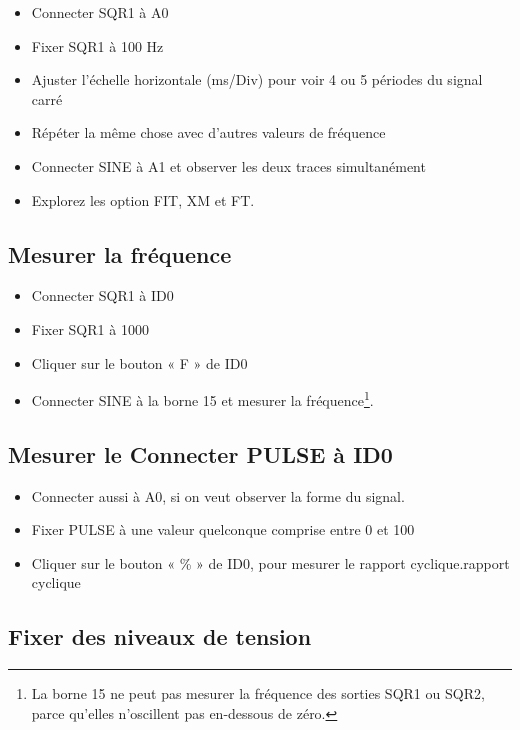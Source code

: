 \documentclass{book}
\begin{document}
\begin{itemize}
  \item Connecter SQR1 à A0
  \item Fixer SQR1 à 100 Hz
  \item Ajuster l'échelle horizontale (ms/Div) pour voir 4 ou 5 périodes du signal carré
  \item Répéter la même chose avec d'autres valeurs de fréquence
  \item Connecter SINE à A1 et observer les deux traces simultanément
  \item Explorez les option FIT, XM et FT.
\end{itemize}




\subsection{Mesurer la fréquence}





\begin{itemize}
  \item Connecter SQR1 à ID0
  \item Fixer SQR1 à 1000
  \item Cliquer sur le bouton « F » de ID0
  \item Connecter SINE à la borne 15 et mesurer la fréquence\footnote{La borne 15 ne peut pas mesurer la fréquence des sorties SQR1 ou SQR2, parce qu'elles n'oscillent pas en-dessous de zéro.}.
\end{itemize}

\subsection{Mesurer le Connecter PULSE à ID0}





\begin{itemize}
  \item Connecter aussi à A0, si on veut observer la forme du signal.
  \item Fixer PULSE à une valeur quelconque comprise entre 0 et 100
  \item Cliquer sur le bouton « \%{} » de ID0, pour mesurer le rapport cyclique.rapport cyclique
\end{itemize}




\subsection{Fixer des niveaux de tension}
\end{document}

